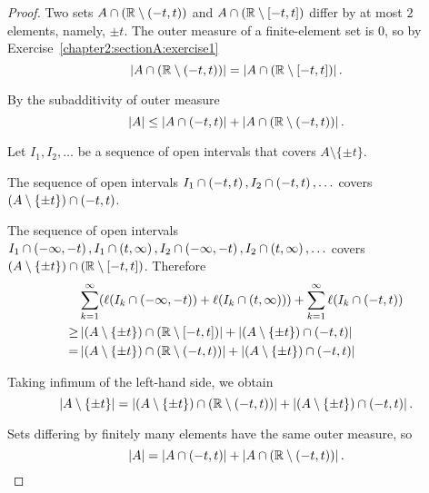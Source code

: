 \begin{proof}
    Two sets $A\cap(\mathbb{R}\setminus\left({-t, t}\right))$ and $A\cap(\mathbb{R}\setminus\left[{-t, t}\right])$ differ by at most $2$ elements, namely, $\pm t$. The outer measure of a finite-element set is $0$, so by Exercise~\ref{chapter2:sectionA:exercise1}
    \[
        \left\vert{A\cap(\mathbb{R}\setminus\left({-t, t}\right))}\right\vert = \left\vert{A\cap(\mathbb{R}\setminus\left[{-t, t}\right])}\right\vert.
    \]

    By the subadditivity of outer measure
    \[
        \left\vert{A}\right\vert\leq \left\vert{A\cap\left({-t,t}\right)}\right\vert + \left\vert{A\cap(\mathbb{R}\setminus \left({-t, t}\right))}\right\vert.
    \]

    Let $I_{1}, I_{2}, \ldots$ be a sequence of open intervals that covers $A\setminus\{\pm t\}$.

    The sequence of open intervals $I_{1}\cap \left({-t, t}\right), I_{2}\cap \left({-t, t}\right), \ldots$ covers $(A\setminus\{\pm t\})\cap \left({-t, t}\right)$.

    The sequence of open intervals $I_{1}\cap \left({-\infty, -t}\right), I_{1}\cap \left({t, \infty}\right), I_{2}\cap \left({-\infty, -t}\right), I_{2}\cap \left({t, \infty}\right), \ldots$ covers $(A\setminus\{\pm t\})\cap (\mathbb{R}\setminus\left[{-t, t}\right])$. Therefore
    \begin{align*}
             & \sum^{\infty}_{k=1}(\ell(I_{k}\cap \left({-\infty, -t}\right)) + \ell(I_{k}\cap\left({t, \infty}\right))) + \sum^{\infty}_{k=1}\ell(I_{k}\cap\left({-t, t}\right)) \\
        \geq & \left\vert{(A\setminus \{\pm t\})\cap (\mathbb{R}\setminus\left[{-t, t}\right])}\right\vert + \left\vert{(A\setminus \{\pm t\})\cap\left({-t, t}\right)}\right\vert                                \\
        =    & \left\vert{(A\setminus \{\pm t\})\cap (\mathbb{R}\setminus\left({-t, t}\right))}\right\vert + \left\vert{(A\setminus \{\pm t\})\cap\left({-t, t}\right)}\right\vert
    \end{align*}

    Taking infimum of the left-hand side, we obtain
    \[
        \left\vert{A\setminus\{\pm t\}}\right\vert = \left\vert{(A\setminus \{\pm t\})\cap (\mathbb{R}\setminus\left({-t, t}\right))}\right\vert + \left\vert{(A\setminus \{\pm t\})\cap\left({-t, t}\right)}\right\vert.
    \]

    Sets differing by finitely many elements have the same outer measure, so
    \[
        \left\vert{A}\right\vert = \left\vert{A\cap \left({-t, t}\right)}\right\vert + \left\vert{A\cap (\mathbb{R}\setminus \left({-t, t}\right))}\right\vert.\qedhere
    \]
\end{proof}
\newpage

